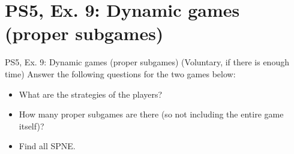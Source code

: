 \section{PS5, Ex. 9: Dynamic games (proper subgames)}

\begin{frame}{PS5, Ex. 9: Dynamic games (proper subgames)}
  (Voluntary, if there is enough time) Answer the following questions for the two games below:
  \begin{itemize}
    \item What are the strategies of the players?
    \item How many proper subgames are there (so not including the entire game itself)?
    \item Find all SPNE.
  \end{itemize}
\end{frame}

